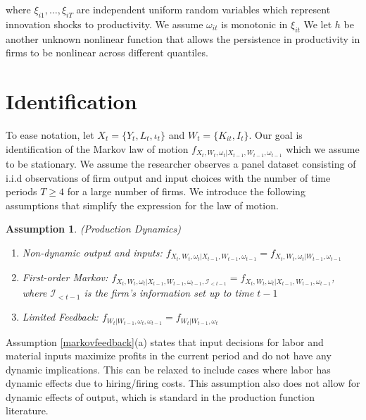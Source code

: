 \documentclass{article}
\newtheorem{assump}{Assumption}[subsection]
\begin{document}
where $\xi_{i1},\dots, \xi_{iT}$ are independent uniform random variables which represent innovation shocks to productivity. We assume $\omega_{it}$ is monotonic in $\xi_{it}$ We let $h$ be another unknown nonlinear function that allows the persistence in productivity in firms to be nonlinear across different quantiles.

\section{Identification}

To ease notation, let $X_{t}=\{Y_{t}, L_{t}, \iota_{t}\}$ and $W_{t}=\{K_{it}, I_{t}\}$. Our goal is identification of the Markov law of motion $f_{X_{t}, W_{t}, \omega_{t}|X_{t-1}, W_{t-1}, \omega_{t-1}}$ which we assume to be stationary. We assume the researcher observes a panel dataset consisting of i.i.d observations of firm output and input choices with the number of time periods $T\geq 4$ for a large number of firms. We introduce the following assumptions that simplify the expression for the law of motion. 

\begin{assump}(Production Dynamics)\label{markovfeedback}
~
    \begin{enumerate}[label=\alph*)]
        \item \textit{Non-dynamic output and inputs:} $f_{X_{t}, W_{t}, \omega_{t}|X_{t-1}, W_{t-1}, \omega_{t-1}}=f_{X_{t}, W_{t}, \omega_{t}|W_{t-1}, \omega_{t-1}}$
        \item \textit{First-order Markov:} $f_{X_{t}, W_{t}, \omega_{t}|X_{t-1}, W_{t-1}, \omega_{t-1}, \mathcal{I}_{<t-1}}=f_{X_{t}, W_{t}, \omega_{t}|X_{t-1}, W_{t-1}, \omega_{t-1}}$, where $\mathcal{I}_{<t-1}$ is the firm's information set up to time $t-1$
        \item \textit{Limited Feedback:} $f_{W_{t}|W_{t-1}, \omega_{t}, \omega_{t-1}}=f_{W_{t}|W_{t-1}, \omega_{t}}$ 
    \end{enumerate}
\end{assump}

Assumption \eqref{markovfeedback}(a) states that input decisions for labor and material inputs maximize profits in the current period and do not have any dynamic implications. This can be relaxed to include cases where labor has dynamic effects due to hiring/firing costs. This assumption also does not allow for dynamic effects of output, which is standard in the production function literature.\\ 
\end{document}
